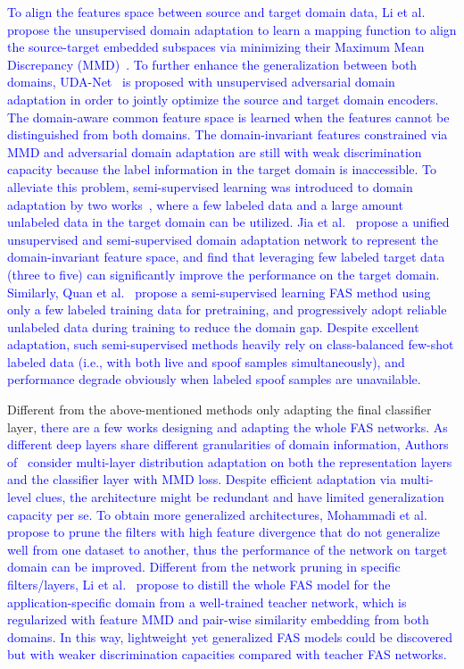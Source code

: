 \documentclass[10pt,journal,compsoc]{IEEEtran}
\begin{document}
\textcolor{blue}{To align the features space between source and target domain data, Li et al.~\cite{li2018unsupervised} propose the unsupervised domain adaptation to learn a mapping function to align the source-target embedded subspaces via minimizing their Maximum Mean Discrepancy (MMD)~\cite{gretton2012kernel}. To further enhance the generalization between both domains, UDA-Net~\cite{wang2019improving,wang2020unsupervised} is proposed with unsupervised adversarial domain adaptation in order to jointly optimize the source and target domain encoders. The domain-aware common feature space is learned when the features cannot be distinguished from both domains. The domain-invariant features constrained via MMD and adversarial domain adaptation are still with weak discrimination capacity because the label information in the target domain is inaccessible. To alleviate this problem, semi-supervised learning was introduced to domain adaptation by two works~\cite{jia2021unified,quan2021progressive}, where a few labeled data and a large amount unlabeled data in the target domain can be utilized. Jia et al.~\cite{jia2021unified} propose a unified unsupervised and semi-supervised domain adaptation network to represent the domain-invariant feature space, and find that leveraging few labeled target data (three to five) can significantly improve the performance on the target domain. Similarly, Quan et al.~\cite{quan2021progressive} propose a semi-supervised learning FAS method using only a few labeled training data for pretraining, and progressively adopt reliable unlabeled data during training to reduce the domain gap. Despite excellent adaptation, such semi-supervised methods heavily rely on class-balanced few-shot labeled data (i.e., with both live and spoof samples simultaneously), and performance degrade obviously when labeled spoof samples are unavailable.} 


Different from the above-mentioned methods only adapting the final classifier layer, \textcolor{blue}{there are a few works designing and adapting the whole FAS networks. As different deep layers share different granularities of domain information, Authors of~\cite{zhou2019face} consider multi-layer distribution adaptation on both the representation layers and the classifier layer with MMD loss. Despite efficient adaptation via multi-level clues, the architecture might be redundant and have limited generalization capacity per se. To obtain more generalized architectures, Mohammadi et al.~\cite{mohammadi2020domain} propose to prune the filters with high feature divergence that do not generalize well from one dataset to another, thus the performance of the network on target domain can be improved. Different from the network pruning in specific filters/layers, Li et al.~\cite{li2020face2} propose to distill the whole FAS model for the application-specific domain from a well-trained teacher network, which is regularized with feature MMD and pair-wise similarity embedding from both domains. In this way, lightweight yet generalized FAS models could be discovered but with weaker discrimination capacities compared with teacher FAS networks.}  
\end{document}
